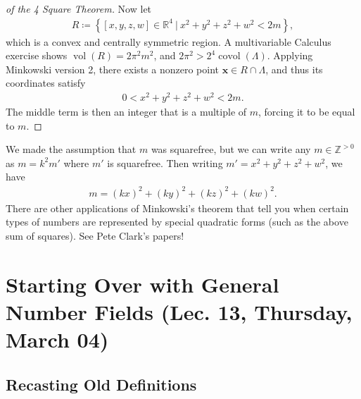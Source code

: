 \begin{proof}[of the 4 Square Theorem]
Now let
\begin{align*}
R \coloneqq\left\{{ {\left[ {x,y,z,w} \right]} \in {\mathbb{R}}^4 {~\mathrel{\Big|}~}x^2 + y^2 + z^2 + w ^2 < 2m  }\right\}
,\end{align*}
which is a convex and centrally symmetric region. A multivariable
Calculus exercise shows \(\operatorname{vol}(R) = 2\pi^2 m^2\), and
\(2\pi^2 > 2^4 \operatorname{covol}( \Lambda)\). Applying Minkowski
version 2, there exists a nonzero point
\(\mathbf{x} \in R \cap\Lambda\), and thus its coordinates satisfy
\begin{align*}
0 < x^2 + y^2 + z^2 + w^2 < 2m
.\end{align*}
The middle term is then an integer that is a multiple of \(m\), forcing
it to be equal to \(m\).

\end{proof}

\begin{remark}

We made the assumption that \(m\) was squarefree, but we can write any
\(m\in {\mathbb{Z}}^{>0}\) as \(m = k^2 m'\) where \(m'\) is squarefree.
Then writing \(m' = x^2 + y^2 + z^2 + w^2\), we have
\begin{align*} 
m = (kx)^2 + (ky)^2 + (kz)^2 + (kw)^2 
.\end{align*}
There are other applications of Minkowski's theorem that tell you when
certain types of numbers are represented by special quadratic forms
(such as the above sum of squares). See Pete Clark's papers!

\end{remark}

\hypertarget{starting-over-with-general-number-fields-lec.-13-thursday-march-04}{%
\section{Starting Over with General Number Fields (Lec. 13, Thursday,
March
04)}\label{starting-over-with-general-number-fields-lec.-13-thursday-march-04}}

\hypertarget{recasting-old-definitions}{%
\subsection{Recasting Old Definitions}\label{recasting-old-definitions}}

